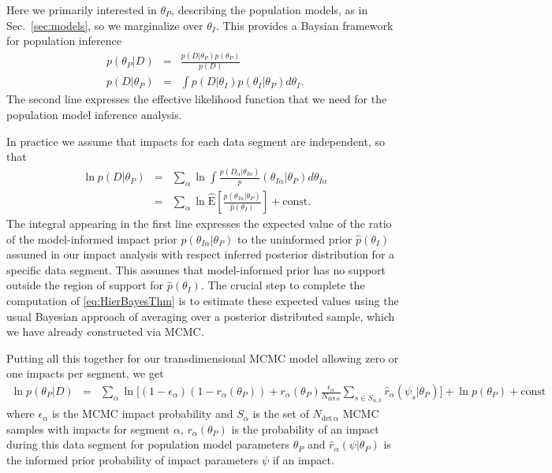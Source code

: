 \documentclass[twocolumn, trackchanges]{aastex62}
\begin{document}
Here we primarily interested in $\theta_P$, describing the population models, as in Sec.~\ref{sec:models}, so we marginalize over $\theta_I$.  This provides a Baysian framework for population inference
\begin{eqnarray}
  p(\theta_P|D)&=&\frac{ p(D|\theta_P)p(\theta_P)}{p(D)}\label{eq:HierBayesThm}\\
  p(D|\theta_P)&=&\int p(D|\theta_I)p(\theta_I|\theta_P)d\theta_I\label{eq:metaLike}.
\end{eqnarray}
The second line expresses the effective likelihood function that we need for the population model inference analysis.

In practice we assume that impacts for each data segment are independent, so that
\begin{eqnarray}
  \ln {p(D|\theta_P)}&=&\sum_\alpha \ln\int \frac{p(D_\alpha|\theta_{I\alpha})}p(\theta_{I\alpha}|\theta_P)d\theta_{I\alpha}\\
  &=&\sum_\alpha \ln\hat{\mathrm{E}}\left[\frac{p(\theta_{I\alpha}|\theta_P)}{\hat p(\theta_I)}\right]+\mathrm{const}\label{eq:metaLikeSegmented}.
\end{eqnarray}
The integral appearing in the first line expresses the expected value of the ratio of the model-informed impact prior $p(\theta_{I\alpha}|\theta_P)$ to the uninformed prior $\hat p(\theta_{I})$ assumed in our impact analysis with respect inferred posterior distribution for a specific data segment.  This assumes that model-informed prior has no support outside the region of support for $\hat p(\theta_{I})$.
The crucial step to complete the computation of \eqref{eq:HierBayesThm} is to estimate these expected values using the usual Bayesian approach of averaging over a posterior distributed sample, which we have already constructed via MCMC.

Putting all this together for our transdimensional MCMC model allowing zero or one impacts per segment, we get
\begin{eqnarray}
  \ln p(\theta_P|D)&=& \sum_\alpha\ln\Big[ (1-\epsilon_\alpha)(1-r_\alpha(\theta_P))+r_\alpha(\theta_P)\frac{\epsilon_\alpha}{N_{\mathrm{det}\,\alpha}}\sum_{s\in S_{\alpha,k}}\hat r_\alpha(\psi_s|\theta_P)\Big]+\ln p(\theta_P)+\mathrm{const}\label{eq:HierPost}
\end{eqnarray}
where $\epsilon_\alpha$ is the MCMC impact probability and $S_{\alpha}$ is the set of $N_{\mathrm{det}\,\alpha}$ MCMC samples with impacts for segment $\alpha$, $r_\alpha(\theta_P)$ is the probability of an impact during this data segment for population model parameters $\theta_P$ and $\hat r_\alpha(\psi|\theta_P)$ is the informed prior probability of impact parameters $\psi$ if an impact.
\end{document}
